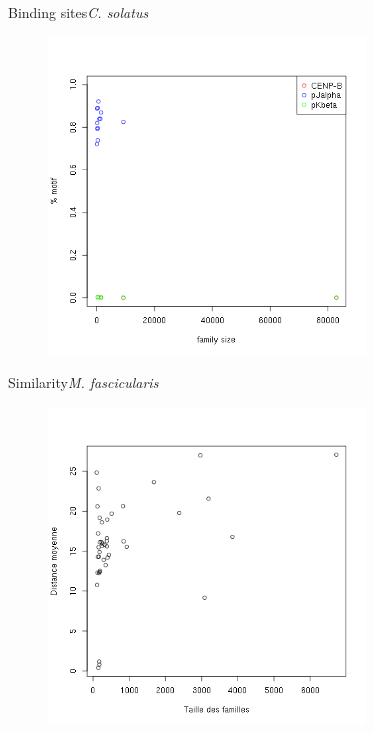 \documentclass[11pt]{beamer}
\begin{document}
\begin{frame}{Binding sites}{\textit{C. solatus}}
\begin{center}
	\begin{figure}
		\includegraphics[width=0.75\textwidth]{img/Cso_motifs.png}
	\end{figure}	
\end{center}
\end{frame}
\begin{frame}{Similarity}{\textit{M. fascicularis}}
	\begin{figure}
		\includegraphics[width=0.75\textwidth]{img/Mf_similarity_090.png}
	\end{figure}	
\end{frame}
\end{document}

